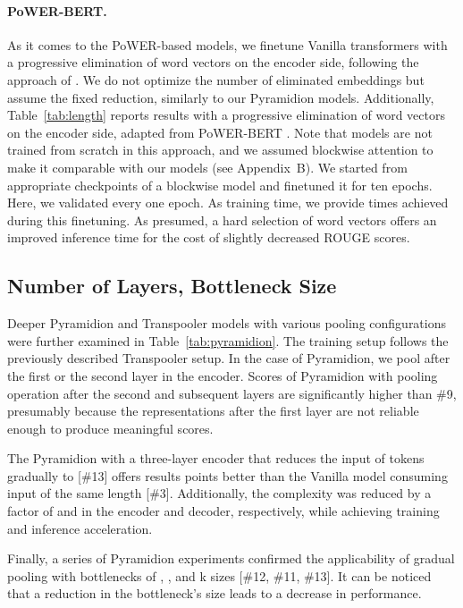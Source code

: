 \documentclass{article}
\begin{document}
{\paragraph{PoWER-BERT.}
As it comes to the PoWER-based models, we finetune Vanilla transformers with a progressive elimination of word vectors on the encoder side, following the approach of \citet{pmlr-v119-goyal20a}. We do not optimize the number of eliminated embeddings but assume the fixed reduction, similarly to our Pyramidion models.
Additionally, Table~\ref{tab:length} reports results with a progressive elimination of word vectors on the encoder side, adapted from PoWER-BERT \citep{pmlr-v119-goyal20a}. Note that models are not trained from scratch in this approach, and we assumed blockwise attention to make it comparable with our models (see Appendix~B). We started from appropriate checkpoints of a blockwise model and finetuned it for ten epochs. Here, we validated every one epoch. As training time, we provide times achieved during this finetuning. As presumed, a hard selection of word vectors offers an improved inference time for the cost of slightly decreased ROUGE scores. }


\subsection{Number of Layers, Bottleneck Size}\label{appendix_sub_pyramidion}
Deeper Pyramidion and Transpooler models with various pooling configurations were further examined in Table~\ref{tab:pyramidion}. The training setup follows the previously described Transpooler setup. In the case of Pyramidion, we pool after the first or the second layer in the encoder. 
Scores of Pyramidion with pooling operation after the second and subsequent layers are significantly higher than \#9, presumably because the representations after the first layer are not reliable enough to produce meaningful scores.

The Pyramidion with a three-layer encoder that reduces the input of  tokens gradually to  [\#13] offers results  points better than the Vanilla model consuming input of the same length [\#3]. Additionally, the complexity was reduced by a factor of  and  in the encoder and decoder, respectively, while achieving  training and  inference acceleration.

Finally, a series of Pyramidion experiments confirmed the applicability of gradual pooling with bottlenecks of , , and k sizes [\#12, \#11, \#13]. It can be noticed that a reduction in the bottleneck's size leads to a decrease in performance. 
\end{document}
